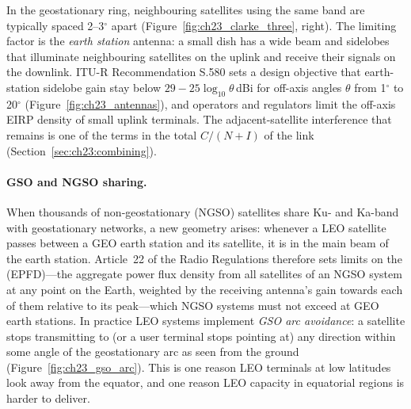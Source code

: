 In the geostationary ring, neighbouring satellites using the same band are typically spaced
2--3$^\circ$ apart (Figure~\ref{fig:ch23_clarke_three}, right). The limiting factor is the
\emph{earth station} antenna: a small dish has a wide beam and sidelobes that illuminate
neighbouring satellites on the uplink and receive their signals on the downlink. ITU-R
Recommendation S.580 sets a design objective that earth-station sidelobe gain stay below
$29-25\log_{10}\theta$\,dBi for off-axis angles $\theta$ from 1$^\circ$ to 20$^\circ$
(Figure~\ref{fig:ch23_antennas}), and operators and regulators limit the off-axis EIRP density of
small uplink terminals. The adjacent-satellite interference that remains is one of the terms in
the total $C/(N+I)$ of the link (Section~\ref{sec:ch23:combining}).

\paragraph{GSO and NGSO sharing.} When thousands of non-geostationary (NGSO) satellites share
Ku- and Ka-band with geostationary networks, a new geometry arises: whenever a LEO satellite
passes between a GEO earth station and its satellite, it is in the main beam of the earth
station. Article~22 of the Radio Regulations therefore sets limits on the  (EPFD)---the aggregate power flux density from all satellites of an NGSO
system at any point on the Earth, weighted by the receiving antenna's gain towards each of them
relative to its peak---which NGSO systems must not exceed at GEO earth stations. In practice LEO
systems implement \emph{GSO arc avoidance}: a satellite stops transmitting to (or a user terminal
stops pointing at) any direction within some angle of the geostationary arc as seen from the
ground (Figure~\ref{fig:ch23_gso_arc}). This is one reason LEO terminals at low latitudes look away
from the equator, and one reason LEO capacity in equatorial regions is harder to deliver.


